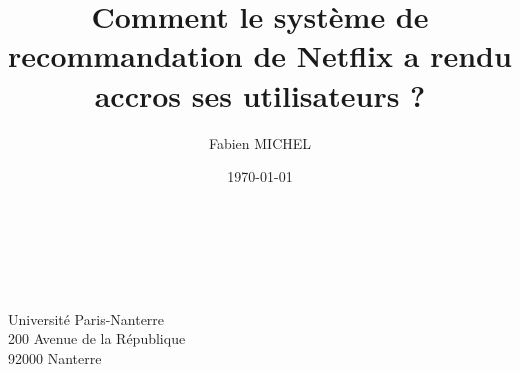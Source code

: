 \documentclass[12pt, a4paper, french, openright]{report}
\title{Comment le système de recommandation de Netflix a rendu
accros ses utilisateurs ?}
\author{Fabien MICHEL}
\date{\today}
\begin{document}


\newpage
~
\thispagestyle{empty}
\newpage

\thispagestyle{empty}


\newpage
\thispagestyle{empty}
\newpage

\thispagestyle{empty}


\tableofcontents
\thispagestyle{empty}
\setcounter{page}{0}

\newpage
~
\thispagestyle{empty}
\setcounter{page}{0}
\newpage




















\newpage
\printbibliography

\newpage
\listoffigures

\newpage
\thispagestyle{empty}
\vspace*{\fill}
\begin{center}
  Université Paris-Nanterre\\
  200 Avenue de la République\\
  92000 Nanterre
\end{center}
\vspace*{\fill}
\end{document}
